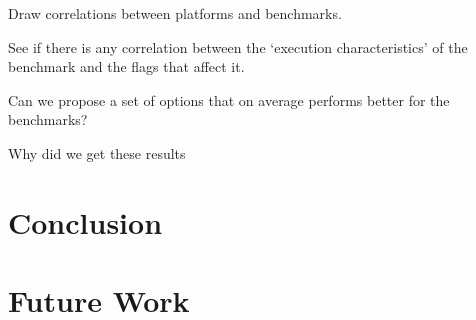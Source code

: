 \documentclass[twocolumn]{article}
\begin{document}
Draw correlations between platforms and benchmarks.

See if there is any correlation between the `execution characteristics' of the benchmark and the flags that affect it.

Can we propose a set of options that on average performs better for the benchmarks?

Why did we get these results


\section*{Conclusion}

\section*{Future Work}

\printbibliography
\end{document}
